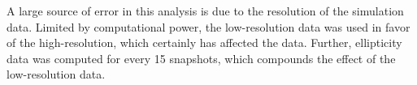 \documentclass[fleqn,usenatbib]{mnras}
\begin{document}
A large source of error in this analysis is due to the resolution of the simulation data. Limited by computational power, the low-resolution data was used in favor of the high-resolution, which certainly has affected the data. Further, ellipticity data was computed for every 15 snapshots, which compounds the effect of the low-resolution data.











\bsp	%
\label{lastpage}
\end{document}
